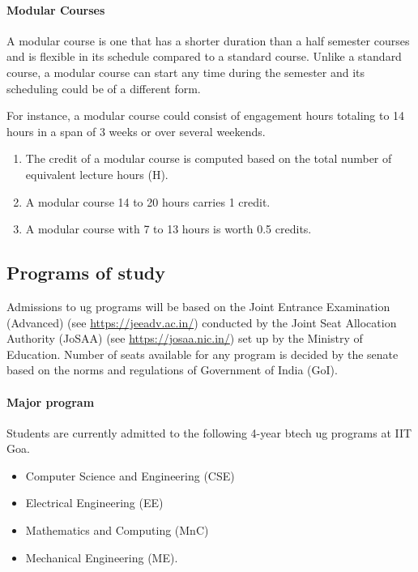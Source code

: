 \paragraph{Modular Courses} A modular course is one that has a shorter duration than a half semester courses and is flexible in its schedule compared to a standard course. Unlike a standard course, a modular course can start any time during the semester and its scheduling could be of a different form.

For instance, a modular course could consist of engagement hours totaling to 14 hours in a span of 3 weeks or over several weekends.  

\begin{enumerate}[leftmargin=15mm]
	\item The credit of a modular course is computed based on the total number of equivalent lecture hours (H).
    \item A modular course 14 to 20 hours carries 1 credit.
    \item A modular course with 7 to 13 hours is worth 0.5 credits.
\end{enumerate}

\subsection{Programs of study}

Admissions to \acrshort{ug} programs will be based on the Joint Entrance Examination (Advanced) (see \url{https://jeeadv.ac.in/}) conducted by the Joint Seat Allocation Authority (JoSAA) (see \url{https://josaa.nic.in/}) set up by the Ministry of Education. Number of seats available for any program is decided by the \gls{senate} based on the norms and regulations of Government of India (GoI).

\paragraph{Major program} Students are currently admitted to the following 4-year \acrfull{btech} \acrshort{ug} programs at IIT Goa.

\begin{itemize}[leftmargin=15mm]
	\item Computer Science and Engineering (CSE)
	\item Electrical Engineering (EE)
	\item Mathematics and Computing (MnC)
	\item Mechanical Engineering (ME).
\end{itemize}

